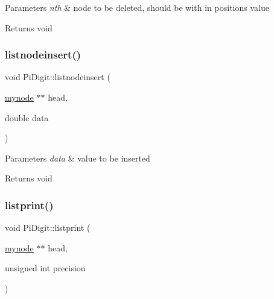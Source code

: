 \begin{DoxyParams}{Parameters}
{\em nth} & node to be deleted, should be with in positions value \\
\hline
\end{DoxyParams}
\begin{DoxyReturn}{Returns}
void 
\end{DoxyReturn}
\mbox{\label{classPiDigit_a2cd414a3059a0ba20a9fa47a09dd7dd0}} 
\subsubsection{\texorpdfstring{listnodeinsert()}{listnodeinsert()}}
{\footnotesize\ttfamily void Pi\+Digit\+::listnodeinsert (\begin{DoxyParamCaption}\item[{\mbox{\hyperlink{structPiDigit_1_1mynode}{mynode}} $\ast$$\ast$}]{head,  }\item[{double}]{data }\end{DoxyParamCaption})\hspace{0.3cm}{\ttfamily [virtual]}}


\begin{DoxyParams}{Parameters}
{\em data} & value to be inserted \\
\hline
\end{DoxyParams}
\begin{DoxyReturn}{Returns}
void 
\end{DoxyReturn}
\mbox{\label{classPiDigit_ae905d997df53e6e2795313174d1a18d6}} 
\subsubsection{\texorpdfstring{listprint()}{listprint()}}
{\footnotesize\ttfamily void Pi\+Digit\+::listprint (\begin{DoxyParamCaption}\item[{\mbox{\hyperlink{structPiDigit_1_1mynode}{mynode}} $\ast$$\ast$}]{head,  }\item[{unsigned int}]{precision }\end{DoxyParamCaption})\hspace{0.3cm}{\ttfamily [virtual]}}


